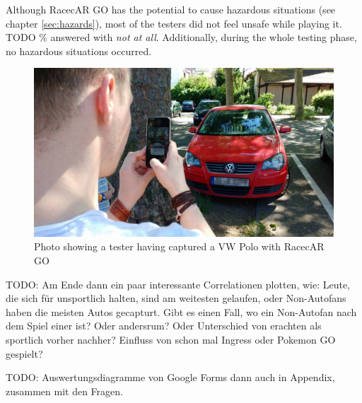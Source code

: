 Although RacecAR GO has the potential to cause hazardous situations (see chapter \ref{sec:hazards}), most of the testers did not feel unsafe while playing it. TODO \% answered with \emph{not at all}. Additionally, during the whole testing phase, no hazardous situations occurred.
\begin{figure}[btph]
  \centering
        \includegraphics[width=.95\linewidth]{gfx/eval5}
        \caption{Photo showing a tester having captured a VW Polo with RacecAR GO}
        \label{fig:eval5}
\end{figure}




TODO: Am Ende dann ein paar interessante Correlationen plotten, wie: Leute, die sich für unsportlich halten, sind am weitesten gelaufen, oder Non-Autofans haben die meisten Autos gecapturt.
Gibt es einen Fall, wo ein Non-Autofan nach dem Spiel einer ist? Oder andersrum?
Oder Unterschied von erachten als sportlich vorher nachher?
Einfluss von schon mal Ingress oder Pokemon GO gespielt?


TODO: Auswertungsdiagramme von Google Forms dann auch in Appendix, zusammen mit den Fragen.





